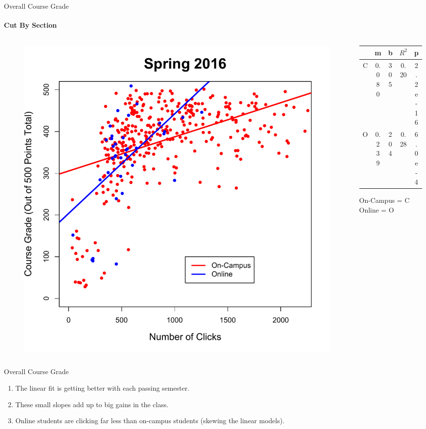 \documentclass[xcolor=x11names,compress]{beamer}
\begin{document}
\begin{frame}{Overall Course Grade}
	\framesubtitle{Cut By Section}
	\begin{columns}
		\begin{column}{0.5\textwidth}
			\begin{figure}
				\includegraphics[width=1.0\textwidth]{img/overall_sp16_section.pdf}
			\end{figure}
		\end{column}
		\begin{column}{0.5\textwidth}	
			\begin{table}[ht]
				\begin{tabular}{|c|c|c|c|c|}
					\hline
					& \textbf{m} & \textbf{b} & \textbf{$R^2$} & \textbf{p}\\
					\hline
					C & 0.080 & 305 & 0.20 & 2.2e-16 \\
					O & 0.239 & 204 & 0.28 & 6.0e-4\\
					\hline
				\end{tabular}
			\end{table}
			On-Campus = C\\
			Online = O
		\end{column}
	\end{columns}
\end{frame}

\begin{frame}{Overall Course Grade}
	\begin{enumerate}
		\item The linear fit is getting better with each passing semester.
		\vspace{2mm}
		\item These small slopes add up to big gains in the class.
		\vspace{2mm}
		\item Online students are clicking far less than on-campus students (skewing the linear models).
	\end{enumerate}
\end{frame}
\end{document}

